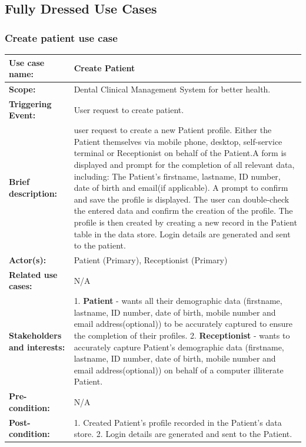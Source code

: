 \documentclass[11 pt]{article}
\begin{document}
\subsection{Fully Dressed Use Cases}
\subsubsection{Create patient use case}

\begin{tabular}{|p{3cm}|p{9cm}|}
\hline
\textbf{Use case name:}& Create Patient\\
\hline
\textbf{Scope:}& Dental Clinical Management System for better health.\\
\hline
\textbf{Triggering Event:}& User request to create patient.\\
\hline
\textbf{Brief description:}& user request to create a new Patient profile. Either the Patient themselves via mobile phone, desktop, self-service terminal or Receptionist on behalf of the Patient.A form is displayed and prompt for the completion of all relevant data, including: The Patient's firstname, lastname, ID number, date of birth and email(if applicable). A prompt to confirm and save the profile is displayed. The user can double-check the entered data and confirm the creation of the profile. The profile is then created by creating a new record in the Patient table in the data store. Login details are generated and sent to the patient.\\
\hline
\textbf{Actor(s):}& Patient (Primary), Receptionist (Primary)\\
\hline
\textbf{Related use cases:}& N/A\\
\hline
\textbf{Stakeholders and interests:}& 1. \textbf{Patient} - wants all their demographic data (firstname, lastname, ID number, date of birth, mobile number and email address(optional)) to be accurately captured to ensure the completion of their profiles. 2. \textbf{Receptionist} - wants to accurately capture Patient's demographic data (firstname, lastname, ID number, date of birth, mobile number and email address(optional)) on behalf of a computer illiterate Patient.\\
\hline
\textbf{Pre-condition:}& N/A\\
\hline
\textbf{Post-condition:}& 1. Created Patient's profile recorded in the Patient's data store.  2. Login details are generated and sent to the Patient.\\
\hline
\end{tabular}
\end{document}
